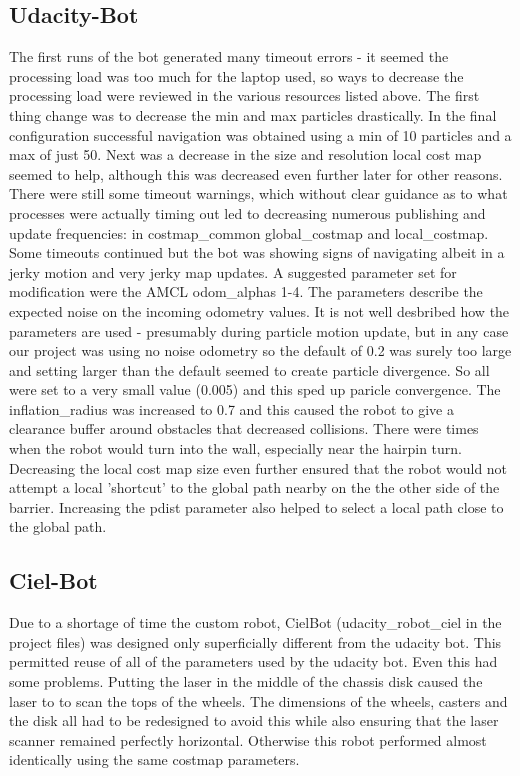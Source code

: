 \documentclass[10pt,journal,compsoc]{IEEEtran}
\begin{document}
\subsection{Udacity-Bot}
The first runs of the bot generated many timeout errors - it seemed the processing load was too much for the laptop used, so ways to decrease the processing load were reviewed in the various resources listed above. The first thing change was to decrease the min and max particles drastically. In the final configuration successful navigation was obtained using a min of 10 particles and a max of just 50. Next was a decrease in the size and resolution local cost map seemed to help, although this was decreased even further later for other reasons. 
There were still some timeout warnings, which without clear guidance as to what processes were actually timing out led to decreasing numerous publishing and update frequencies: in costmap\_common global\_costmap and local\_costmap. Some timeouts continued but the bot was showing signs of navigating albeit in a jerky motion and very jerky map updates. 
A suggested parameter set for modification were the AMCL odom\_alphas 1-4. The parameters describe the expected noise on the incoming odometry values. It is not well desbribed how the parameters are used - presumably during particle motion update, but in any case our project was using no noise odometry so the default of 0.2 was surely too large and setting larger than the default seemed to create particle divergence. So all were set to a very small value (0.005) and this sped up paricle convergence. The inflation\_radius was increased to 0.7 and this caused the robot to give a clearance buffer around obstacles that decreased collisions. There were times when the robot would turn into the wall, especially near the hairpin turn. Decreasing the local cost map size even further ensured that the robot would not attempt a local 'shortcut' to the global path nearby on the the other side of the barrier. Increasing the pdist parameter also helped to select a local path close to the global path.

\subsection{Ciel-Bot}
Due to a shortage of time the custom robot, CielBot (udacity\_robot\_ciel in the project files) was designed only superficially different from the udacity bot. This permitted reuse of all of the parameters used by the udacity bot. Even this had some problems. Putting the laser in the middle of the chassis disk caused the laser to to scan the tops of the wheels. The dimensions of the wheels, casters and the disk all had to be redesigned to avoid this while also ensuring that the laser scanner remained perfectly horizontal. Otherwise this robot performed almost identically using the same costmap parameters.
\end{document}

